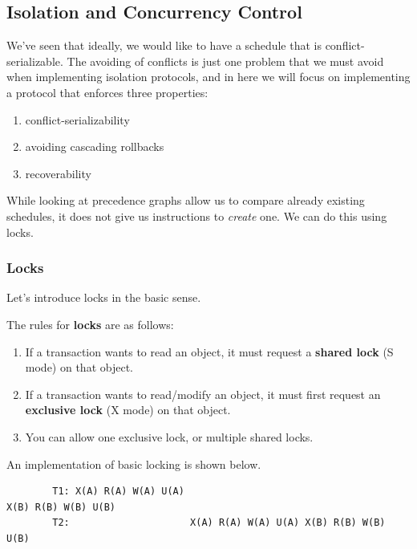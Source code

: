\subsection{Isolation and Concurrency Control} 

    We've seen that ideally, we would like to have a schedule that is conflict-serializable. The avoiding of conflicts is just one problem that we must avoid when implementing isolation protocols, and in here we will focus on implementing a protocol that enforces three properties: 
    \begin{enumerate}
      \item conflict-serializability 
      \item avoiding cascading rollbacks 
      \item recoverability
    \end{enumerate}
    While looking at precedence graphs allow us to compare already existing schedules, it does not give us instructions to \textit{create} one. We can do this using locks. 

  \subsubsection{Locks}

    Let's introduce locks in the basic sense. 

    \begin{definition}[Locks]
      The rules for \textbf{locks} are as follows: 
      \begin{enumerate}
        \item If a transaction wants to read an object, it must request a \textbf{shared lock} (S mode) on that object. 
        \item If a transaction wants to read/modify an object, it must first request an \textbf{exclusive lock} (X mode) on that object. 
        \item You can allow one exclusive lock, or multiple shared locks. 
      \end{enumerate}
    \end{definition}

    \begin{example}
      An implementation of basic locking is shown below. 
      \begin{lstlisting}
        T1: X(A) R(A) W(A) U(A)                                         X(B) R(B) W(B) U(B) 
        T2:                     X(A) R(A) W(A) U(A) X(B) R(B) W(B) U(B) 
      \end{lstlisting}
    \end{example}

